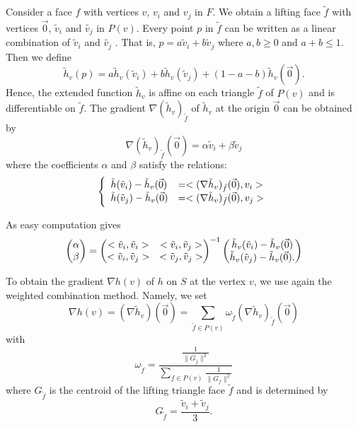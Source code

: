 \documentclass{elsart}
\begin{document}
Consider a face $f$ with vertices $v$, $v_i$ and $v_j$ in $F$. We
obtain a lifting face $\tilde{f}$ with vertices $\vec{0}$,
$\tilde{v}_i$ and $\tilde{v_j}$  in $P(v)$. Every point  $p$ in
$\tilde{f}$ can be written as a linear combination of $\tilde{v}_i$
and $\tilde{v_j}$ . That is, $ p = a\tilde{v}_i+b\tilde{v}_j$ where
$a, b \geq 0$ and $a+b \leq 1$. Then we define
\begin{equation}
\tilde{h}_v(p) = a \tilde{h}_v(\tilde{v}_i) + b
\tilde{h}_v(\tilde{v}_j) +( 1-a-b)\tilde{h}_v(\vec{0}).
\end{equation}
Hence, the extended function $\tilde{h}_v$ is affine on each
triangle $\tilde{f}$ of $P(v)$ and is differentiable on $\tilde{f}$.
The gradient $\nabla (\tilde{h}_v)_{\tilde{f}}$ of $\tilde{h}_v$ at
the origin $\vec{0}$ can be obtained by \begin{equation} \nabla
(\tilde{h}_v)_{\tilde{f}}(\vec{0}) = \alpha \tilde{v}_i + \beta
\tilde{v}_j\end{equation} where the coefficients $\alpha$ and
$\beta$ satisfy the relations:
\begin{equation} \left\{
\begin{array}{ll} \tilde{h}(\tilde{v}_i) - \tilde{h}_v(\vec{0}) & =<
(\nabla \tilde{h}_v)_{\tilde{f}}(\vec{0}), v_i> \cr
\tilde{h}(\tilde{v}_j) - \tilde{h}_v(\vec{0}) & = < (\nabla
\tilde{h}_v)_{\tilde{f}}(\vec{0}),v_j>
\end{array}\right.\end{equation}

As easy computation gives
\begin{equation}\begin{pmatrix} \alpha \cr
\beta
\end{pmatrix} = \begin{pmatrix} <\tilde{v}_i,\tilde{v}_i> &
<\tilde{v}_i,\tilde{v}_j> \cr <\tilde{v}_i,\tilde{v}_j> &
<\tilde{v}_j, \tilde{v}_j> \end{pmatrix}^{-1} \begin{pmatrix}
\tilde{h}_v(\tilde{v}_i) - \tilde{h}_v(\vec{0}) \cr
\tilde{h}_v(\tilde{v}_j) - \tilde{h}_v(\vec{0}).
\end{pmatrix}\end{equation}

To obtain the gradient $\nabla h(v)$ of $h$ on $S$ at the vertex
$v$, we use again the weighted combination method. Namely, we set
\begin{equation}\nabla h(v) = ( \nabla \tilde{h}_v)(\vec{0}) = \sum_{\tilde{f}
\in P(v)} \omega_{\tilde{f}}(\nabla
\tilde{h}_v)_{\tilde{f}}(\vec{0})\end{equation} with
\begin{equation}\label{centroidweight}
\omega_{\tilde{f}} = \frac{\frac{1}{\| G_{\tilde{f}}\|^2}}{\sum_{f
\in P(v)} \frac{1}{\| G_{f}\|^2}} \end{equation}
 where $G_{\tilde{f}}$ is the centroid of the lifting triangle face
$\tilde{f}$ and is determined by
\begin{equation}G_{\tilde{f}} =
\frac{\tilde{v}_i+\tilde{v}_j}{3}.\end{equation}
\end{document}
